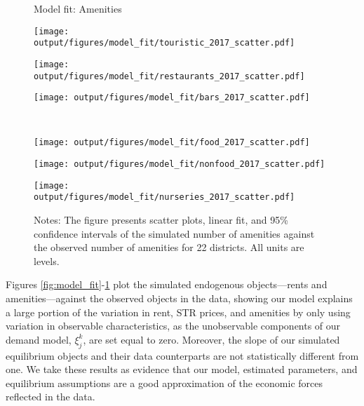\documentclass[11pt]{article}
\begin{document}
\begin{figure}[ht]
\centering
    \caption{Model fit: Amenities}\label{fig:model_fit_full}
    \begin{minipage}{0.34\textwidth}
    \centering
        \texttt{[image: output/figures/model\_fit/touristic\_2017\_scatter.pdf]}
    \end{minipage}%
    \begin{minipage}{0.33\textwidth}
    \centering
        \texttt{[image: output/figures/model\_fit/restaurants\_2017\_scatter.pdf]}
    \end{minipage}%
    \begin{minipage}{0.33\textwidth}
    \centering
        \texttt{[image: output/figures/model\_fit/bars\_2017\_scatter.pdf]}
    \end{minipage}\\
    \begin{minipage}{0.33\textwidth}
    \centering
        \texttt{[image: output/figures/model\_fit/food\_2017\_scatter.pdf]}
    \end{minipage}%
    \begin{minipage}{0.34\textwidth}
    \centering
        \texttt{[image: output/figures/model\_fit/nonfood\_2017\_scatter.pdf]}
    \end{minipage}%
    \begin{minipage}{0.34\textwidth}
    \centering
        \texttt{[image: output/figures/model\_fit/nurseries\_2017\_scatter.pdf]}
    \end{minipage}
    \caption*{\footnotesize Notes: The figure presents scatter plots, linear fit, and 95\% confidence intervals of the simulated number of amenities against the observed number of amenities for 22 districts. All units are levels.}
\end{figure}

Figures \ref{fig:model_fit}-\ref{fig:model_fit_full} plot the simulated endogenous objects---rents and amenities---against the observed objects in the data, showing our model explains a large portion of the variation in rent, STR prices, and amenities by only using variation in observable characteristics, as the unobservable components of our demand model, $\xi^k_j$, are set equal to zero. Moreover, the slope of our simulated equilibrium objects and their data counterparts are not statistically different from one. We take these results as evidence that our model, estimated parameters, and equilibrium assumptions are a good approximation of the economic forces reflected in the data.
\end{document}
